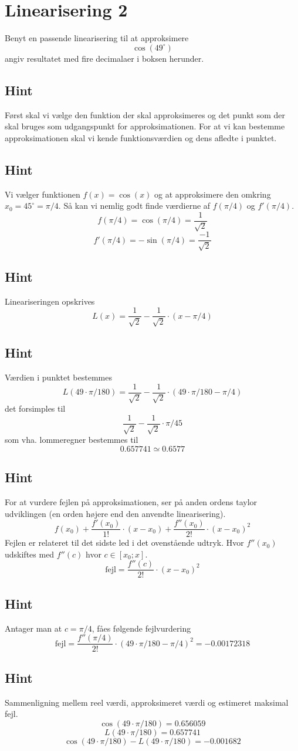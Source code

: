 \documentclass{article}
\newenvironment{exercise}[1]{\newpage\section{#1}}{}
\newcommand{\answerbox}[1]{\fbox{$#1$}}
\newcommand{\hint}{\subsection*{Hint}}
\begin{document}
\begin{exercise}{Linearisering 2}
Benyt en passende linearisering til at approksimere
\[
\cos(49^\circ)
\]
angiv resultatet med fire decimalaer i boksen herunder.
\answerbox{0.6577}

\hint
Først skal vi vælge den funktion der skal approksimeres
og det punkt som der skal bruges som udgangspunkt for 
approksimationen.
For at vi kan bestemme approksimationen skal vi 
kende funktionsværdien og dens afledte i punktet.

\hint
Vi vælger funktionen $f(x) = \cos(x)$ og at approksimere den 
omkring $x_0 = 45^\circ = \pi / 4$.
Så kan vi nemlig godt finde værdierne af $f(\pi / 4)$ og $f'(\pi / 4)$.
\[
f(\pi / 4) = \cos(\pi / 4) = \frac{1}{\sqrt{2}}
\]
\[
f'(\pi / 4) = -\sin(\pi / 4) = \frac{-1}{\sqrt{2}}
\]

\hint
Lineariseringen opskrives
\[
L(x) = \frac{1}{\sqrt{2}} - \frac{1}{\sqrt{2}} \cdot (x - \pi / 4)
\]

\hint
Værdien i punktet bestemmes
\[
L(49 \cdot \pi / 180) = \frac{1}{\sqrt{2}} - \frac{1}{\sqrt{2}} \cdot (49 \cdot \pi / 180 - \pi / 4) 
\]
det forsimples til 
\[
\frac{1}{\sqrt{2}} - \frac{1}{\sqrt{2}} \cdot \pi / 45
\]
som vha. lommeregner bestemmes til 
\[
0.657741 \simeq 0.6577
\]

\hint
For at vurdere fejlen på approksimationen, ser på anden 
ordens taylor udviklingen (en orden højere end den 
anvendte linearisering).
\[
f(x_0) 
	+ \frac{f'(x_0)}{1!} \cdot (x - x_0) 
	+ \frac{f''(x_0)}{2!} \cdot (x - x_0)^2
\]
Fejlen er relateret til det sidste led i det ovenstående udtryk.
Hvor $f''(x_0)$ udskiftes med $f''(c)$ hvor $c \in [x_0; x]$.
\[
\textrm{fejl} = \frac{f''(c)}{2!} \cdot (x - x_0)^2
\]

\hint 
Antager man at $c = \pi/4$, fåes følgende fejlvurdering
\[
\textrm{fejl} = \frac{f''(\pi/4)}{2!} \cdot (49 \cdot \pi / 180 - \pi / 4)^2 = 
-0.00172318\]

\hint
Sammenligning mellem reel værdi, approksimeret værdi og estimeret maksimal fejl.
\[
\cos(49 \cdot \pi/180) = 0.656059
\]
\[
L(49 \cdot \pi/180) = 0.657741
\]
\[
\cos(49 \cdot \pi/180) - L(49 \cdot \pi/180) = -0.001682
\]

\end{exercise}
\end{document}
